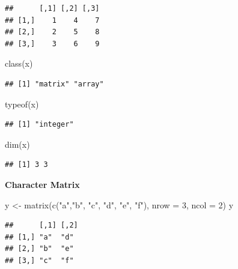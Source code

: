 \documentclass[
]{book}
\newenvironment{Shaded}{\begin{snugshade}}{\end{snugshade}}
\newcommand{\AttributeTok}[1]{\textcolor[rgb]{0.77,0.63,0.00}{#1}}
\newcommand{\DecValTok}[1]{\textcolor[rgb]{0.00,0.00,0.81}{#1}}
\newcommand{\FunctionTok}[1]{\textcolor[rgb]{0.00,0.00,0.00}{#1}}
\newcommand{\NormalTok}[1]{#1}
\newcommand{\OtherTok}[1]{\textcolor[rgb]{0.56,0.35,0.01}{#1}}
\newcommand{\StringTok}[1]{\textcolor[rgb]{0.31,0.60,0.02}{#1}}
\begin{document}
\begin{verbatim}
##      [,1] [,2] [,3]
## [1,]    1    4    7
## [2,]    2    5    8
## [3,]    3    6    9
\end{verbatim}

\begin{Shaded}
\begin{Highlighting}[]
\FunctionTok{class}\NormalTok{(x)}
\end{Highlighting}
\end{Shaded}

\begin{verbatim}
## [1] "matrix" "array"
\end{verbatim}

\begin{Shaded}
\begin{Highlighting}[]
\FunctionTok{typeof}\NormalTok{(x)}
\end{Highlighting}
\end{Shaded}

\begin{verbatim}
## [1] "integer"
\end{verbatim}

\begin{Shaded}
\begin{Highlighting}[]
\FunctionTok{dim}\NormalTok{(x)}
\end{Highlighting}
\end{Shaded}

\begin{verbatim}
## [1] 3 3
\end{verbatim}

\textbf{Character Matrix}

\begin{Shaded}
\begin{Highlighting}[]
\NormalTok{y }\OtherTok{\textless{}{-}} \FunctionTok{matrix}\NormalTok{(}\FunctionTok{c}\NormalTok{(}\StringTok{"a"}\NormalTok{,}\StringTok{"b"}\NormalTok{, }\StringTok{"c"}\NormalTok{, }\StringTok{"d"}\NormalTok{, }\StringTok{"e"}\NormalTok{, }\StringTok{"f"}\NormalTok{), }\AttributeTok{nrow =} \DecValTok{3}\NormalTok{, }\AttributeTok{ncol =} \DecValTok{2}\NormalTok{)}
\NormalTok{y}
\end{Highlighting}
\end{Shaded}

\begin{verbatim}
##      [,1] [,2]
## [1,] "a"  "d" 
## [2,] "b"  "e" 
## [3,] "c"  "f"
\end{verbatim}
\end{document}
